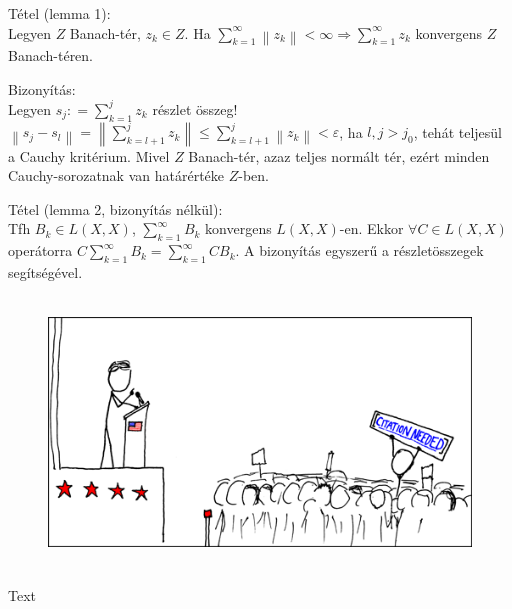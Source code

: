 \documentclass[12pt,a4paper]{scrartcl}
\newenvironment{tetel}{}{}
\newenvironment{bizonyitas}{}{}
\newenvironment{ajanlofig}{\begin{figure}\begin{center}}{
\end{center}\end{figure}}
\begin{document}
\begin{tetel}

Tétel (lemma 1):\\
Legyen \(Z\) Banach-tér, \(z_{k} \in Z\). Ha
\(\left. {\sum\limits_{k = 1}^{\infty}{\left\| z_{k} \right\| < \infty}}\Rightarrow{\sum\limits_{k = 1}^{\infty}z_{k}} \right.\)
konvergens \(Z\) Banach-téren.

\end{tetel}

\begin{bizonyitas}

Bizonyítás:\\
Legyen \(s_{j}: = {\sum\limits_{k = 1}^{j}z_{k}}\) részlet összeg!
\(\left\| {s_{j} - s_{l}} \right\| = \left\| {\sum\limits_{k = l + 1}^{j}z_{k}} \right\| \leq {\sum\limits_{k = l + 1}^{j}\left\| z_{k} \right\|} < \varepsilon\),
ha \(l,j > j_{0}\), tehát teljesül a Cauchy kritérium. Mivel \(Z\)
Banach-tér, azaz teljes normált tér, ezért minden Cauchy-sorozatnak van
határértéke \(Z\)-ben.

\end{bizonyitas}

\begin{tetel}

Tétel (lemma 2, bizonyítás nélkül):\\
Tfh \(B_{k} \in L\left( {X,X} \right)\),
\(\sum\limits_{k = 1}^{\infty}B_{k}\) konvergens
\(L\left( {X,X} \right)\)-en. Ekkor
\(\forall C \in L\left( {X,X} \right)\) operátorra
\(C{\sum\limits_{k = 1}^{\infty}B_{k}} = {\sum\limits_{k = 1}^{\infty}{CB_{k}}}\).
A bizonyítás egyszerű a részletösszegek segítségével.

\end{tetel}

\begin{ajanlo}

\begin{ajanlofig}

\href{https://xkcd.com}{\includegraphics[width=5.20833in,height=2.82292in]{wikipedian_protester.png}}

\end{ajanlofig}

Text

\end{ajanlo}
\end{document}
